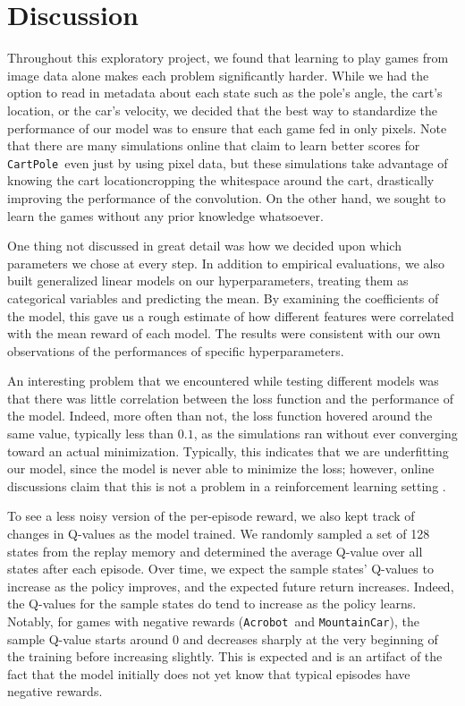 \documentclass[11pt]{article}
\newcommand{\cp}{\texttt{CartPole}}
\newcommand{\ab}{\texttt{Acrobot}}
\newcommand{\mc}{\texttt{MountainCar}}
\begin{document}
\section{Discussion}

Throughout this exploratory project, we found that learning to play games from image data alone makes each problem significantly harder. While we had the option to read in metadata about each state such as the pole's angle, the cart's location, or the car's velocity, we decided that the best way to standardize the performance of our model was to ensure that each game fed in only pixels. Note that there are many simulations online that claim to learn better scores for \cp~even just by using pixel data, but these simulations take advantage of knowing the cart locationcropping the whitespace around the cart, drastically improving the performance of the convolution. On the other hand, we sought to learn the games without any prior knowledge whatsoever.

One thing not discussed in great detail was how we decided upon which parameters we chose at every step. In addition to empirical evaluations, we also built generalized linear models on our hyperparameters, treating them as categorical variables and predicting the mean. By examining the coefficients of the model, this gave us a rough estimate of how different features were correlated with the mean reward of each model. The results were consistent with our own observations of the performances of specific hyperparameters.

An interesting problem that we encountered while testing different models was that there was little correlation between the loss function and the performance of the model. Indeed, more often than not, the loss function hovered around the same value, typically less than $0.1$, as the simulations ran without ever converging toward an actual minimization. Typically, this indicates that we are underfitting our model, since the model is never able to minimize the loss; however, online discussions claim that this is not a problem in a reinforcement learning setting \cite{stackexchange2017loss}.

To see a less noisy version of the per-episode reward, we also kept track of changes in Q-values as the model trained. We randomly sampled a set of 128 states from the replay memory and determined the average Q-value over all states after each episode. Over time, we expect the sample states' Q-values to increase as the policy improves, and the expected future return increases. Indeed, the Q-values for the sample states do tend to increase as the policy learns. Notably, for games with negative rewards (\ab~and \mc), the sample Q-value starts around 0 and decreases sharply at the very beginning of the training before increasing slightly. This is expected and is an artifact of the fact that the model initially does not yet know that typical episodes have negative rewards. 
\end{document}
